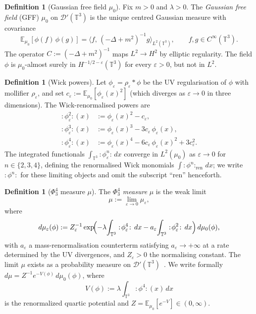 \documentclass[11pt,a4paper]{article}
\theoremstyle{definition}
\newtheorem{definition}[theorem]{Definition}
\newcommand{\T}{\mathbb{T}}
\newcommand{\E}{\mathbb{E}}
\newcommand{\Dc}{\mathcal{D}}
\newcommand{\wick}[1]{:\!#1\!:}
\newcommand{\ip}[2]{\langle #1,\, #2 \rangle}
\begin{document}
\begin{definition}[Gaussian free field $\mu_0$]
Fix $m>0$ and $\lambda>0$.  The \emph{Gaussian free field} (GFF) $\mu_0$ on $\Dc'(\T^3)$ is the unique centred Gaussian measure with covariance
\[
\E_{\mu_0}[\phi(f)\,\phi(g)] = \ip{f}{(-\Delta+m^2)^{-1}g}_{L^2(\T^3)},
\qquad f,g\in C^\infty(\T^3).
\]
The operator $C := (-\Delta+m^2)^{-1}$ maps $L^2\to H^2$ by elliptic regularity.
The field $\phi$ is $\mu_0$-almost surely in $H^{-1/2-\varepsilon}(\T^3)$ for every $\varepsilon>0$, but not in $L^2$.
\end{definition}

\begin{definition}[Wick powers]\label{def:wick}
Let $\phi_\varepsilon = \rho_\varepsilon*\phi$ be the UV regularisation of $\phi$ with mollifier $\rho_\varepsilon$, and set $c_\varepsilon := \E_{\mu_0}[\phi_\varepsilon(x)^2]$ (which diverges as $\varepsilon\to 0$ in three dimensions).  The Wick-renormalised powers are
\begin{align*}
\wick{\phi_\varepsilon^2}(x) &:= \phi_\varepsilon(x)^2 - c_\varepsilon,\\
\wick{\phi_\varepsilon^3}(x) &:= \phi_\varepsilon(x)^3 - 3c_\varepsilon\,\phi_\varepsilon(x),\\
\wick{\phi_\varepsilon^4}(x) &:= \phi_\varepsilon(x)^4 - 6c_\varepsilon\,\phi_\varepsilon(x)^2 + 3c_\varepsilon^2.
\end{align*}
The integrated functionals $\int_{\T^3}\wick{\phi_\varepsilon^n}\,dx$ converge in $L^2(\mu_0)$ as $\varepsilon\to 0$ for $n\in\{2,3,4\}$, defining the renormalised Wick monomials $\int\wick{\phi^n}_{\mathrm{ren}}\,dx$; we write $\wick{\phi^n}$ for these limiting objects and omit the subscript ``ren'' henceforth.
\end{definition}

\begin{definition}[$\Phi^4_3$ measure $\mu$]\label{def:phi4}
The \emph{$\Phi^4_3$ measure} $\mu$ is the weak limit
\[
\mu := \lim_{\varepsilon\to 0}\mu_\varepsilon,
\]
where
\[
d\mu_\varepsilon(\phi) := Z_\varepsilon^{-1}\exp\!\Bigl(-\lambda\!\int_{\T^3}\wick{\phi_\varepsilon^4}\,dx
   -a_\varepsilon\!\int_{\T^3}\wick{\phi_\varepsilon^2}\,dx\Bigr)\,d\mu_0(\phi),
\]
with $a_\varepsilon$ a mass-renormalisation counterterm satisfying $a_\varepsilon\to+\infty$ at a rate determined by the UV divergences, and $Z_\varepsilon>0$ the normalising constant.
The limit $\mu$ exists as a probability measure on $\Dc'(\T^3)$~\cite{GlimmJaffe1987, Hairer2014, GIP2015}.
We write formally $d\mu = Z^{-1}e^{-V(\phi)}\,d\mu_0(\phi)$, where
\[
V(\phi) := \lambda\!\int_{\T^3}\wick{\phi^4}(x)\,dx
\]
is the renormalized quartic potential and $Z = \E_{\mu_0}[e^{-V}]\in(0,\infty)$.
\end{definition}
\end{document}
